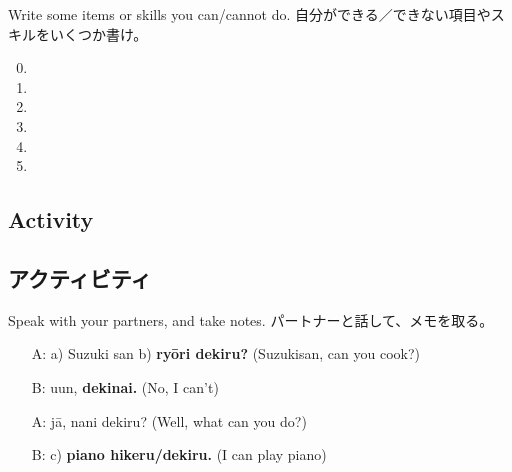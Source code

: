 \documentclass[uplatex,dvipdfmx,b5paper,english,10pt]{jsbook}
\begin{document}
\begin{toiquestion}
\ifEnglish
Write some items or skills you can/cannot do.
\else
自分ができる／できない項目やスキルをいくつか書け。
\fi
\end{toiquestion}

\begin{multicols}{2}
\begin{enumerate}
 \setcounter{enumi}{-1}
 \item \hrulefill\par
       \vspace{-1.2\baselineskip}\hspace{1em}{\bfseries ry\=ori}
       \vspace{.2\baselineskip}
 \item \hrulefill
 \item \hrulefill
 \item \hrulefill
 \item \hrulefill
 \item \hrulefill
\end{enumerate}
\end{multicols}

\ifEnglish
\subsection{Activity}
\else
\subsection{アクティビティ}
\fi

\begin{toiquestion}
\ifEnglish
Speak with your partners, and take notes.
\else
パートナーと話して、メモを取る。
\fi
\end{toiquestion}

\begin{itemize}
 \item[A:] a) Suzuki san b) {\bfseries ry\=ori dekiru?} (Suzukisan, can you cook?)
 \item[B:] uun, {\bfseries dekinai.} (No, I can't)
 \item[A:] j\=a, nani dekiru? (Well, what can you do?)
 \item[B:] c) {\bfseries piano hikeru/dekiru.} (I can play piano)
\end{itemize}
\end{document}

